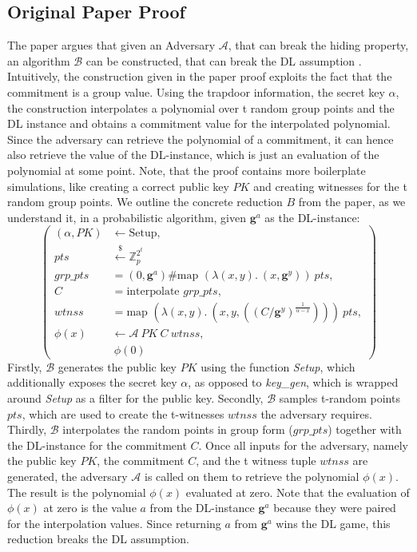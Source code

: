 \subsection*{Original Paper Proof}
The paper argues that given an Adversary $\mathcal{A}$, that can break the hiding property, an algorithm $\mathcal{B}$ can be constructed, that can break the DL assumption \parencite{KZG}. Intuitively, the construction given in the paper proof exploits the fact that the commitment is a group value. Using the trapdoor information, the secret key $\alpha$, the construction interpolates a polynomial over t random group points and the DL instance and obtains a commitment value for the interpolated polynomial. Since the adversary can retrieve the polynomial of a commitment, it can hence also retrieve the value of the DL-instance, which is just an evaluation of the polynomial at some point. Note, that the proof contains more boilerplate simulations, like creating a correct public key $PK$ and creating witnesses for the t random group points. We outline the concrete reduction $B$ from the paper, as we understand it, in a probabilistic algorithm, given $\mathbf{g}^a$ as the DL-instance:
\begin{equation*}
    \left(
        \begin{aligned}
            (\alpha,PK) & \leftarrow \text{Setup}, \\
            pts & \overset{{\scriptscriptstyle\$}}{\leftarrow} \mathbb{Z}_p^{2^t}\\
            grp\_pts &= (0,\mathbf{g}^a)\#\text{map } (\lambda (x,y).\ (x,\mathbf{g}^y))\ pts,\\
            C &= \text{interpolate } grp\_pts,\\ 
            wtnss &= \text{map } (\lambda (x,y).\ (x,y, ((C/\mathbf{g}^y)^{\frac{1}{\alpha-x}})))\ pts,\\
            \phi(x) & \leftarrow \mathcal{A}\ PK \ C\ wtnss, \\
            & \ \phi(0)
        \end{aligned}
    \right)
\end{equation*}
Firstly, $\mathcal{B}$ generates the public key $PK$ using the function \textit{Setup}, which additionally exposes the secret key $\alpha$, as opposed to \textit{key\_gen}, which is wrapped around \textit{Setup} as a filter for the public key. Secondly, $\mathcal{B}$ samples t-random points $pts$, which are used to create the t-witnesses $wtnss$ the adversary requires. Thirdly, $\mathcal{B}$ interpolates the random points in group form ($grp\_pts$) together with the DL-instance for the commitment $C$. Once all inputs for the adversary, namely the public key $PK$, the commitment $C$, and the t witness tuple $wtnss$ are generated, the adversary $\mathcal{A}$ is called on them to retrieve the polynomial $\phi(x)$. The result is the polynomial $\phi(x)$ evaluated at zero. Note that the evaluation of $\phi(x)$ at zero is the value $a$ from the DL-instance $\mathbf{g}^a$ because they were paired for the interpolation values. Since returning $a$ from $\mathbf{g}^a$ wins the DL game, this reduction breaks the DL assumption.

